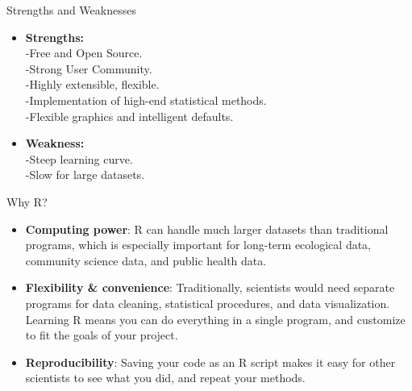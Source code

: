 \documentclass[
  ignorenonframetext,
]{beamer}
\providecommand{\tightlist}{%
  \setlength{\itemsep}{0pt}\setlength{\parskip}{0pt}}
\begin{document}
\begin{frame}{Strengths and Weaknesses}
\label{strengths-and-weaknesses}
\begin{itemize}
\tightlist
\item
  \textbf{Strengths:}\\
  -Free and Open Source.\\
  -Strong User Community.\\
  -Highly extensible, flexible.\\
  -Implementation of high-end statistical methods.\\
  -Flexible graphics and intelligent defaults.
\end{itemize}

\begin{itemize}
\tightlist
\item
  \textbf{Weakness:}\\
  -Steep learning curve.\\
  -Slow for large datasets.
\end{itemize}
\end{frame}

\begin{frame}{Why R?}
\label{why-r}
\begin{itemize}
\tightlist
\item
  \textbf{Computing power}: R can handle much larger datasets than
  traditional programs, which is especially important for long-term
  ecological data, community science data, and public health data.
\end{itemize}

\begin{itemize}
\tightlist
\item
  \textbf{Flexibility \& convenience}: Traditionally, scientists would
  need separate programs for data cleaning, statistical procedures, and
  data visualization.\\
  Learning R means you can do everything in a single program, and
  customize to fit the goals of your project.
\end{itemize}

\begin{itemize}
\tightlist
\item
  \textbf{Reproducibility}: Saving your code as an R script makes it
  easy for other scientists to see what you did, and repeat your
  methods.
\end{itemize}
\end{frame}
\end{document}

